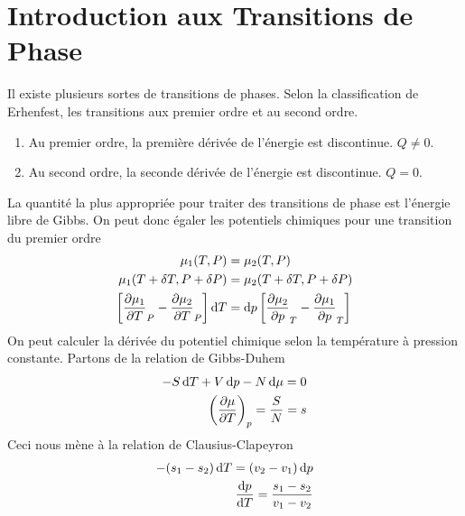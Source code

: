 \section{Introduction aux Transitions de Phase} %
\label{sec:Introduction aux Transitions de Phase}

Il existe plusieurs sortes de transitions de phases. Selon la classification
de Erhenfest, les transitions aux premier ordre et au second ordre.
\begin{enumerate}
    \item Au premier ordre, la première dérivée de l'énergie est discontinue.
        $Q\neq0$.
    \item Au second ordre, la seconde dérivée de l'énergie est discontinue.
        $Q=0$.
\end{enumerate}
La quantité la plus appropriée pour traiter des transitions de phase est
l'énergie libre de Gibbs. On peut donc égaler les potentiels chimiques pour
une transition du premier ordre
\begin{align}
    \mu_1(T,P)&=\mu_2(T,P)\\
    \mu_1(T+\delta T,P+\delta P)&=
    \mu_2(T+\delta T,P+\delta P)\\
    \qty[\pdv{\mu_1}{T}_P-\pdv{\mu_2}{T}_P]\dd{T}&=
    \dd{p}\qty[\pdv{\mu_2}{p}_T-\pdv{\mu_1}{p}_T]
\end{align}
On peut calculer la dérivée du potentiel chimique selon la température à
pression constante. Partons de la relation de Gibbs-Duhem
\begin{align}
    -S\dd{T}+V\dd{p}-N\dd{\mu}=0\\
    \qty(\pdv{\mu}{T})_p=\frac{S}{N}=s
\end{align}
Ceci nous mène à la relation de Clausius-Clapeyron
\begin{align}
    -(s_1-s_2)\dd{T}=(v_2-v_1)\dd{p}\\
    \dv{p}{T}=\frac{s_1-s_2}{v_1-v_2}
\end{align}

